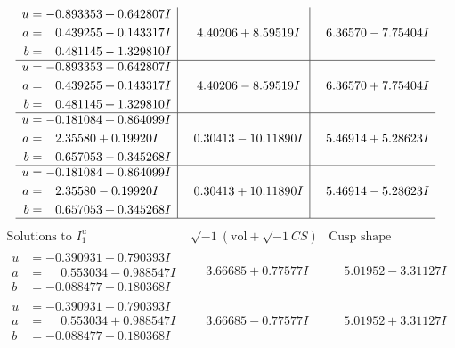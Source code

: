 \documentclass[1p]{elsarticle_modified}
\theoremstyle{definition}
\newcommand{\I}{\sqrt{-1}}
\begin{document}
$$\begin{array}{c|c|c}
\begin{aligned}
u &= -0.893353 + 0.642807 I \\
a &= \phantom{-}0.439255 - 0.143317 I \\
b &= \phantom{-}0.481145 - 1.329810 I\end{aligned}
 & \phantom{-}4.40206 + 8.59519 I & \phantom{-}6.36570 - 7.75404 I \\ \hline\begin{aligned}
u &= -0.893353 - 0.642807 I \\
a &= \phantom{-}0.439255 + 0.143317 I \\
b &= \phantom{-}0.481145 + 1.329810 I\end{aligned}
 & \phantom{-}4.40206 - 8.59519 I & \phantom{-}6.36570 + 7.75404 I \\ \hline\begin{aligned}
u &= -0.181084 + 0.864099 I \\
a &= \phantom{-}2.35580 + 0.19920 I \\
b &= \phantom{-}0.657053 - 0.345268 I\end{aligned}
 & \phantom{-}0.30413 - 10.11890 I & \phantom{-}5.46914 + 5.28623 I \\ \hline\begin{aligned}
u &= -0.181084 - 0.864099 I \\
a &= \phantom{-}2.35580 - 0.19920 I \\
b &= \phantom{-}0.657053 + 0.345268 I\end{aligned}
 & \phantom{-}0.30413 + 10.11890 I & \phantom{-}5.46914 - 5.28623 I\\
 \hline 
 \end{array}$$\newpage$$\begin{array}{c|c|c}  
\text{Solutions to }I^u_{1}& \I (\text{vol} + \sqrt{-1}CS) & \text{Cusp shape}\\
 \hline 
\begin{aligned}
u &= -0.390931 + 0.790393 I \\
a &= \phantom{-}0.553034 - 0.988547 I \\
b &= -0.088477 - 0.180368 I\end{aligned}
 & \phantom{-}3.66685 + 0.77577 I & \phantom{-}5.01952 - 3.31127 I \\ \hline\begin{aligned}
u &= -0.390931 - 0.790393 I \\
a &= \phantom{-}0.553034 + 0.988547 I \\
b &= -0.088477 + 0.180368 I\end{aligned}
 & \phantom{-}3.66685 - 0.77577 I & \phantom{-}5.01952 + 3.31127 I \\ \hline\begin{aligned}

\end{aligned}
\end{array}$$
\end{document}
